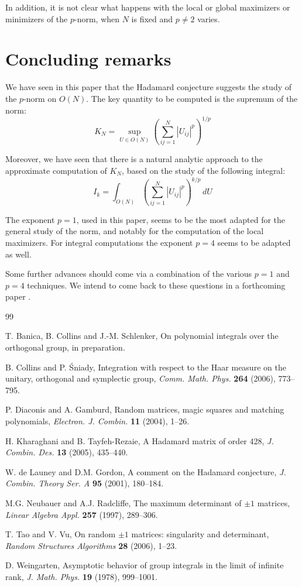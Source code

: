 \documentclass[12pt]{amsart}
\begin{document}
In addition, it is not clear what happens with the local or global maximizers or minimizers of the $p$-norm, when $N$ is fixed and $p\neq 2$ varies.

\section{Concluding remarks}

We have seen in this paper that the Hadamard conjecture suggests the study of the $p$-norm on $O(N)$. The key quantity to be computed is the supremum of the norm:
$$K_N=\sup_{U\in O(N)}\left(\sum_{ij=1}^N|U_{ij}|^p\right)^{1/p}$$

Moreover, we have seen that there is a natural analytic approach to the approximate computation of $K_N$, based on the study of the following integral:
$$I_k=\int_{O(N)}\left(\sum_{ij=1}^N|U_{ij}|^p\right)^{k/p}\,dU$$

The exponent $p=1$, used in this paper, seems to be the most adapted for the general study of the norm, and notably for the computation of the local maximizers. For integral computations the exponent $p=4$ seems to be adapted as well. 

Some further advances should come via a combination of the various $p=1$ and $p=4$ techniques. We intend to come back to these questions in a forthcoming paper \cite{bcs}.

\begin{thebibliography}{99}

T. Banica, B. Collins and J.-M. Schlenker, On polynomial integrals over the orthogonal group, in preparation.

B. Collins and P. \'Sniady, Integration with respect to the Haar measure on the unitary, orthogonal and symplectic group, {\em Comm. Math. Phys.} {\bf 264} (2006), 773--795.

P. Diaconis and A. Gamburd, Random matrices, magic squares and matching polynomials, {\em Electron. J. Combin.} {\bf 11} (2004), 1--26.

H. Kharaghani and B. Tayfeh-Rezaie, A Hadamard matrix of order 428, {\em J. Combin. Des.} {\bf 13} (2005), 435--440.

W. de Launey and D.M. Gordon, A comment on the Hadamard conjecture, {\em J. Combin. Theory Ser. A} {\bf 95} (2001), 180--184.

M.G. Neubauer and A.J. Radcliffe, The maximum determinant of $\pm 1$ matrices, {\em Linear Algebra Appl.} {\bf 257} (1997), 289--306.

T. Tao and V. Vu, On random $\pm 1$ matrices: singularity and determinant, {\em Random Structures Algorithms} {\bf 28} (2006), 1--23. 

D. Weingarten, Asymptotic behavior of group integrals in the limit of infinite rank, {\em J. Math. Phys.} {\bf 19} (1978), 999--1001.
\end{thebibliography}
\end{document}
